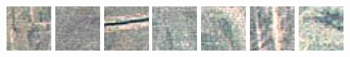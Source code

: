 \documentclass[a4paper,11pt]{article}
\begin{document}
\begin{figure}[h!]
\centering
\includegraphics[width=0.13\textwidth]{img/regiones/C1_50x50_01.png}
\includegraphics[width=0.13\textwidth]{img/regiones/C1_50x50_02.png}
\includegraphics[width=0.13\textwidth]{img/regiones/C1_50x50_03.png}
\includegraphics[width=0.13\textwidth]{img/regiones/C1_50x50_04.png}
\includegraphics[width=0.13\textwidth]{img/regiones/C1_50x50_05.png}
\includegraphics[width=0.13\textwidth]{img/regiones/C1_50x50_06.png}
\includegraphics[width=0.13\textwidth]{img/regiones/C1_50x50_07.png}
\vspace{0.5cm}


\end{figure}
\end{document}
